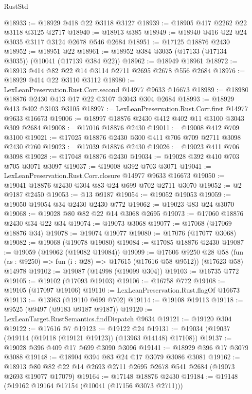 \begin{lexlean}{RustStd}
\begin{coremodule}
@18933 := @18929 @418 @22 @3118 @3127
@18939 := @18905 @417 @2262 @22 @3118 @3125 @2717
@18940 := @18913 @385
@18949 := @18940 @416 @22 @24 @3035 @3117 @3124 @2678 @546 @2684
@18951 := @17125 @18876 @2430
@18952 := @18951 @22
@18961 := @18952 @384 @3035 (@17133 (@17134 @3035)) (@10041 (@17139 @384 @22))
@18962 := @18949 @18961
@18972 := @18913 @414 @82 @22 @14 @3114 @2711 @2695 @2678 @556 @2684
@18976 := @18929 @414 @22 @3110 @3112
@18980 := LexLeanPreservation.Rust.Corr.second @14977 @9633 @16673
@18989 := @18980 @18876 @2430 @413 @17 @22 @3107 @3043 @304 @2684
@18993 := @18929 @413 @402 @3103 @3105
@18997 := LexLeanPreservation.Rust.Corr.first @14977 @9633 @16673
@19006 := @18997 @18876 @2430 @412 @402 @11 @3100 @3043 @309 @2684
@19008 := @17016 @18876 @2430
@19011 := @19008 @412 @709 @3100
@19021 := @17025 @18876 @2430 @300 @411 @706 @709 @2711 @3098 @2430 @760
@19023 := @17039 @18876 @2430
@19026 := @19023 @411 @706 @3098
@19028 := @17048 @18876 @2430
@19034 := @19028 @392 @410 @703 @705 @3071 @3097
@19037 := @19008 @392 @703 @3071
@19041 := LexLeanPreservation.Rust.Corr.closure @14977 @9633 @16673
@19050 := @19041 @18876 @2430 @304 @83 @24 @699 @702 @2711 @3070
@19052 := @2 @9187 @2450
@19053 := @13 @9187
@19054 := @19052 @19053
@19059 := @19050 @19054 @34 @2430 @2430 @772
@19062 := @19023 @83 @24 @3070
@19068 := @19028 @80 @82 @22 @14 @3068 @2695
@19073 := @17060 @18876 @2430 @34 @22 @34
@19074 := @19073 @3068
@19077 := @17068 (@17069 @18876 @34)
@19078 := @19074 @19077
@19080 := @17076 (@17077 @3068)
@19082 := @19068 (@19078 @19080)
@19084 := @17085 @18876 @2430
@19087 := @19059 (@19062 (@19082 @19084))
@19099 := @17606
    @9250
    @28
    @58
    (fun (as : @9250) => fun (i : @28) => @17615 (@17616 @58 @9512))
    (@17623 @58)
    @14978
@19102 := @19087 (@14998 (@19099 @304))
@19103 := @16735 @772
@19105 := @19102 (@17093 @19103)
@19106 := @16758 @772
@19108 := @19105 (@17097 @19106)
@19110 := LexLeanPreservation.Rust.flagOf @16673
@19113 := @13963 (@19110 @699 @702)
@19114 := @19108 @19113
@19118 := @9525 (@9497 (@9183 @9187 @9187))
@19120 := LexLeanTarget.RustSemantics.findDispatch @9634
@19121 := @19120 @304
@19122 := @17616 @7
@19123 := @19122 @24
@19131 := @19034 (@19037 (@19114 (@19118 (@19121 @19123)) (@13963 @14148) @17108))
@19137 := @19028 @396 @409 @17 @699 @3090 @3096
@19141 := @18929 @396 @17 @3079 @3088
@19148 := @18904 @394 @83 @24 @17 @3079 @3086 @3081
@19162 := @18913 @80 @82 @22 @14 @2693 @2711 @2695 @2678 @541 @2684 (@19073 @2693 @19077 @17079)
@19164 := @17148 @18876 @2430
@19184 := @19148
    (@19162 @19164 @17154 (@10041 (@17156 @3073 @2711)))

\end{coremodule}
\end{lexlean}
